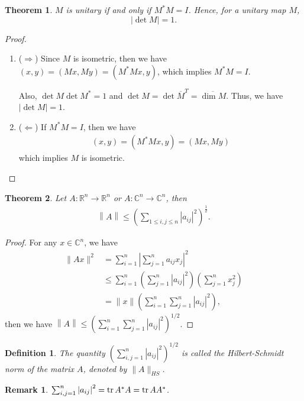 \documentclass[11pt]{book}
\newtheorem{definition}{Definition}[chapter]
\newtheorem{theorem}{Theorem}[chapter]
\newtheorem{remark}{Remark}[chapter]
\theoremstyle{definition}
\numberwithin{equation}{chapter}
\begin{document}
\begin{theorem}
$M$ is unitary if and only if $M^*M = I$. Hence, for a unitary map $M$, $$\left|\det M\right| = 1.$$
\end{theorem}
\begin{proof}
~\begin{enumerate}[label=(\arabic*)]
    \item ($\Rightarrow$) Since $M$ is isometric, then we have $(x,y) = (Mx, My) = (M^* M x, y)$, which implies $M^* M = I$.
    
    Also, $\det M \det M^* = 1$ and $\det M = \det \overline{M}^T = \overline{\dim  M}$. Thus, we have $|\det M| = 1$.
    \item ($\Leftarrow$) If $M^*M = I$, then we have
    \begin{align*}
        (x,y) = (M^* M x, y) = (Mx, My)
    \end{align*}
    which implies $M$ is isometric.
\end{enumerate}
\end{proof}

\medskip

\begin{theorem}
Let $A:\mathbb{R}^n \to \mathbb{R}^n$ or $A:\mathbb{C}^n \to \mathbb{C}^n$, then 
\begin{align*}
    \left\|A\right\| \leq \left(\sum_{1\leq i,j\leq n} \left|a_{ij}\right|^2\right)^{\frac{1}{2}}.
\end{align*}
\end{theorem}
\begin{proof}
For any $x\in \mathbb{C}^n$, we have
\begin{align*}
    \|Ax\|^2 & = \sum^n_{i=1} \left|\sum^n_{j=1}a_{ij} x_j\right|^2 \\
    & \leq \sum^n_{i=1} \left(\sum^n_{j=1}\left|a_{ij}\right|^2 \right) \left(\sum^n_{j=1} x_j^2 \right) \\
    & = \|x\| \left(\sum^n_{i=1}\sum^n_{j=1}\left|a_{ij}\right|^2 \right),
\end{align*}
then we have $\left\|A\right\|\leq \left(\sum^n_{i=1}\sum^n_{j=1}\left|a_{ij}\right|^2 \right)^{1/2}$.
\end{proof}

\begin{definition}
The quantity $\left(\sum^n_{i,j=1}\left|a_{ij}\right|^2 \right)^{1/2}$ is called the Hilbert-Schmidt norm of the matrix $A$, denoted by $\|A\|_{HS}$. 
\end{definition}

\begin{remark}
$\sum^n_{i,j=1}\left|a_{ij}\right|^2 = \tr A^*A = \tr AA^*$.
\end{remark}
\end{document}
